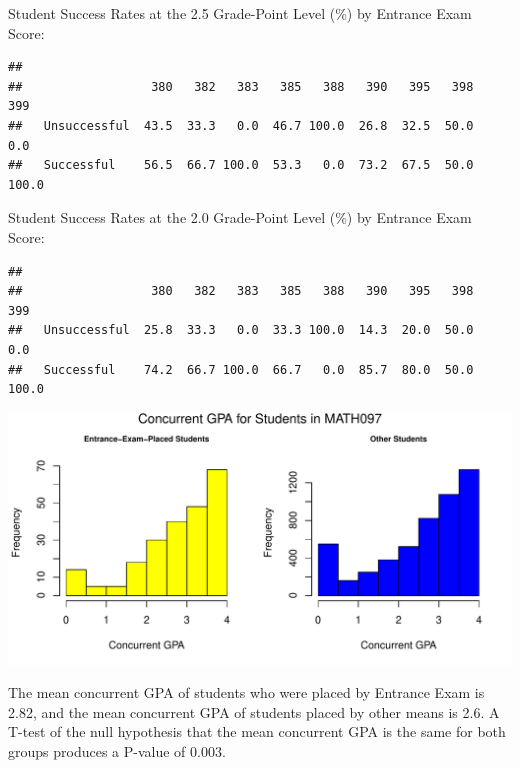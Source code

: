 \documentclass[twoside]{article}\usepackage[]{graphicx}\usepackage[]{color}
\makeatletter
\def\maxwidth{ %
  \ifdim\Gin@nat@width>\linewidth
    \linewidth
  \else
    \Gin@nat@width
  \fi
}
\newenvironment{kframe}{%
 \def\at@end@of@kframe{}%
 \ifinner\ifhmode%
  \def\at@end@of@kframe{\end{minipage}}%
  \begin{minipage}{\columnwidth}%
 \fi\fi%
 \def\FrameCommand##1{\hskip\@totalleftmargin \hskip-\fboxsep
 \colorbox{shadecolor}{##1}\hskip-\fboxsep
     \hskip-\linewidth \hskip-\@totalleftmargin \hskip\columnwidth}%
 \MakeFramed {\advance\hsize-\width
   \@totalleftmargin\z@ \linewidth\hsize
   \@setminipage}}%
 {\par\unskip\endMakeFramed%
 \at@end@of@kframe}
\newenvironment{knitrout}{}{} %
\makeatother
\begin{document}
Student Success Rates  at the 2.5 Grade-Point Level (\%) by Entrance Exam Score:

\begin{knitrout}
\color{fgcolor}\begin{kframe}
\begin{verbatim}
##               
##                  380   382   383   385   388   390   395   398   399
##   Unsuccessful  43.5  33.3   0.0  46.7 100.0  26.8  32.5  50.0   0.0
##   Successful    56.5  66.7 100.0  53.3   0.0  73.2  67.5  50.0 100.0
\end{verbatim}
\end{kframe}
\end{knitrout}

Student Success Rates  at the 2.0 Grade-Point Level (\%) by Entrance Exam Score:

\begin{knitrout}
\color{fgcolor}\begin{kframe}
\begin{verbatim}
##               
##                  380   382   383   385   388   390   395   398   399
##   Unsuccessful  25.8  33.3   0.0  33.3 100.0  14.3  20.0  50.0   0.0
##   Successful    74.2  66.7 100.0  66.7   0.0  85.7  80.0  50.0 100.0
\end{verbatim}
\end{kframe}
\end{knitrout}


\begin{knitrout}
\color{fgcolor}
\includegraphics[width=\maxwidth]{figure/GPAgraphs097-1} 

\end{knitrout}

The mean concurrent GPA of students who were placed by Entrance Exam is 2.82, and the mean concurrent GPA of students placed by other means is 2.6.  A T-test of the null hypothesis that the mean concurrent GPA is the same for both groups produces a P-value of 0.003.
\end{document}
